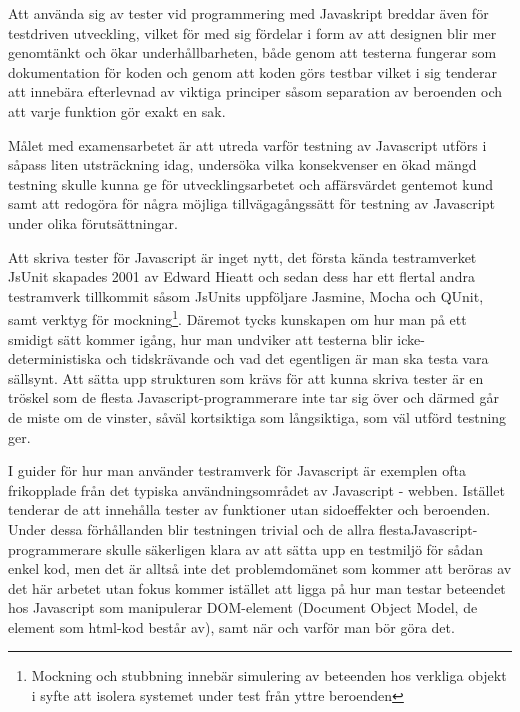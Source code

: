 \documentclass[11pt]{article}
\begin{document}
Att använda sig av tester vid programmering med Javaskript breddar även för testdriven utveckling, vilket för med sig fördelar i form av att designen blir mer genomtänkt och ökar underhållbarheten, både genom att testerna fungerar som dokumentation för koden och genom att koden görs testbar vilket i sig tenderar att innebära efterlevnad av viktiga principer såsom separation av beroenden och att varje funktion gör exakt en sak.

Målet med examensarbetet är att utreda varför testning av Javascript utförs i såpass liten utsträckning idag, undersöka vilka konsekvenser en ökad mängd testning skulle kunna ge för utvecklingsarbetet och affärsvärdet gentemot kund samt att redogöra för några möjliga tillvägagångssätt för testning av Javascript under olika förutsättningar.

Att skriva tester för Javascript är inget nytt, det första kända testramverket JsUnit skapades 2001 av Edward Hieatt\cite{GoingFaster}\cite{JsUnitGithub} och sedan dess har ett flertal andra testramverk tillkommit såsom JsUnits uppföljare Jasmine\cite{JasmineSite}, Mocha\cite{MochaSite} och QUnit\cite{QUnitSite}, samt verktyg för mockning\footnote{Mockning och stubbning innebär simulering av beteenden hos verkliga objekt i syfte att isolera systemet under test från yttre beroenden}. Däremot tycks kunskapen om hur man på ett smidigt sätt kommer igång, hur man undviker att testerna blir icke-deterministiska och tidskrävande och vad det egentligen är man ska testa vara sällsynt. Att sätta upp strukturen som krävs för att kunna skriva tester är en tröskel som de flesta Javascript-programmerare inte tar sig över och därmed går de miste om de vinster, såväl kortsiktiga som långsiktiga, som väl utförd testning ger.

I guider för hur man använder testramverk för Javascript är exemplen ofta frikopplade från det typiska användningsområdet av Javascript - webben. Istället tenderar de att innehålla tester av funktioner utan sidoeffekter och beroenden. Under dessa förhållanden blir testningen trivial och de allra flestaJavascript-programmerare skulle säkerligen klara av att sätta upp en testmiljö för sådan enkel kod, men det är alltså inte det problemdomänet som kommer att beröras av det här arbetet utan fokus kommer istället att ligga på hur man testar beteendet hos Javascript som manipulerar DOM-element (Document Object Model, de element som html-kod består av), samt när och varför man bör göra det.
\end{document}
